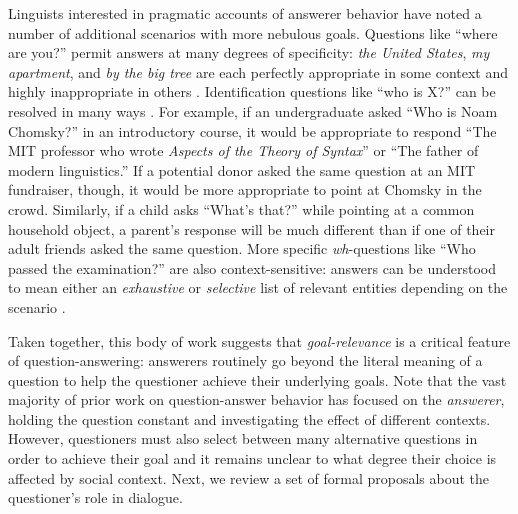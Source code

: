 \documentclass[12pt, floatsintext, jou]{apa6}
\begin{document}

Linguists interested in pragmatic accounts of answerer behavior have noted a number of additional scenarios with more nebulous goals. Questions like ``where are you?'' permit answers at many degrees of specificity: \emph{the United States}, \emph{my apartment}, and \emph{by the big tree} are each perfectly appropriate in some context and highly inappropriate in others \cite{Potts12_CardsDialogueCorpus}. Identification questions like ``who is X?'' can be resolved in many ways  \cite{BoerLycan75_KnowingWho, Gerbrandy00_Identity, Aloni05_ConceptualCovers}. 
For example, if an undergraduate asked ``Who is Noam Chomsky?'' in an introductory course, it would be appropriate to respond ``The MIT professor who wrote \emph{Aspects of the Theory of Syntax}'' or ``The father of modern linguistics.'' If a potential donor asked the same question at an MIT fundraiser, though, it would be more appropriate to point at Chomsky in the crowd. 
Similarly, if a child asks ``What's that?'' while pointing at a common household object, a parent's response will be much different than if one of their adult friends asked the same question. More specific \emph{wh}-questions like ``Who passed the examination?'' are also context-sensitive: answers can be understood to mean either an \emph{exhaustive} or \emph{selective} list of relevant entities depending on the scenario \cite{SchulzVanRooij06_ExhaustiveInterpretation}.

Taken together, this body of work suggests that \emph{goal-relevance} is a critical feature of question-answering: answerers routinely go beyond the literal meaning of a question to help the questioner achieve their underlying goals. Note that the vast majority of prior work on question-answer behavior has focused on the \emph{answerer}, holding the question constant and investigating the effect of different contexts. 
However, questioners must also select between many alternative questions in order to achieve their goal and it remains unclear to what degree their choice is affected by social context. Next, we review a set of formal proposals about the questioner's role in dialogue.  
\end{document}

